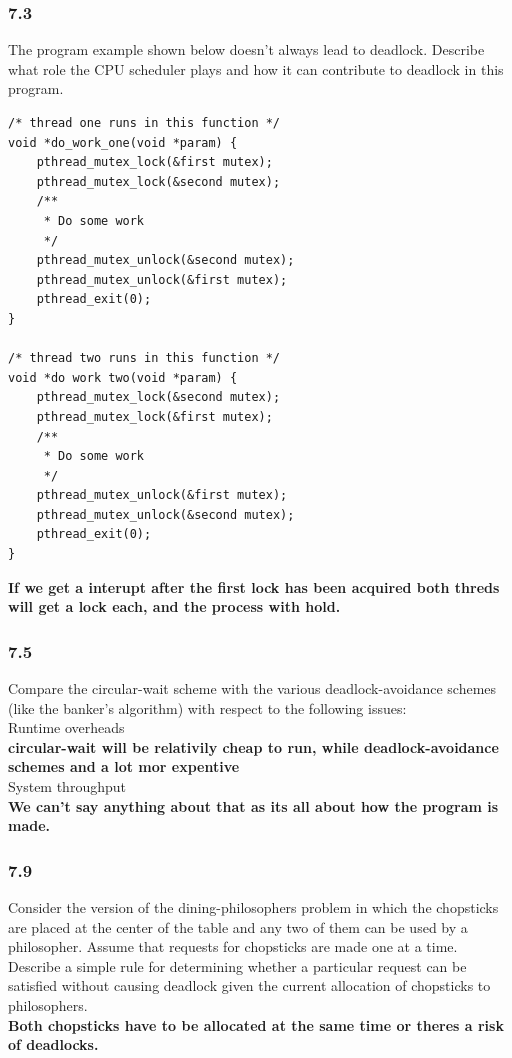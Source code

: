 \documentclass[a4paper,10pt,titlepage]{report}
\begin{document}
\newpage

\subsubsection{7.3} The program example shown below doesn't always lead to deadlock. Describe what role the CPU scheduler plays and how it can contribute to deadlock in this program.
\begin{lstlisting}[frame=single]
/* thread one runs in this function */
void *do_work_one(void *param) {
    pthread_mutex_lock(&first mutex);
    pthread_mutex_lock(&second mutex);
    /**
     * Do some work
     */
    pthread_mutex_unlock(&second mutex);
    pthread_mutex_unlock(&first mutex);
    pthread_exit(0);
}
 
/* thread two runs in this function */
void *do work two(void *param) {
    pthread_mutex_lock(&second mutex);
    pthread_mutex_lock(&first mutex);
    /**
     * Do some work
     */
    pthread_mutex_unlock(&first mutex);
    pthread_mutex_unlock(&second mutex);
    pthread_exit(0);
}   
\end{lstlisting}
\textbf{If we get a interupt after the first lock has been acquired both threds will get a lock each, and the process with hold.}

\subsubsection{7.5} Compare the circular-wait scheme with the various deadlock-avoidance schemes (like the banker's algorithm) with respect to the following issues:\\
Runtime overheads\\
\textbf{circular-wait will be relativily cheap to run, while  deadlock-avoidance schemes and a lot mor expentive}\\
System throughput\\
\textbf{We can't say anything about that as its all about how the program is made.}

\subsubsection{7.9} Consider the version of the dining-philosophers problem in which the chopsticks are placed at the center of the table and any two of them can be used by a philosopher. Assume that requests for chopsticks are made one at a time. Describe a simple rule for determining whether a particular request can be satisfied without causing deadlock given the current allocation of chopsticks to philosophers.\\
\textbf{Both chopsticks have to be allocated at the same time or theres a risk of deadlocks.}
\end{document}
